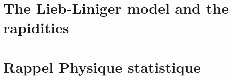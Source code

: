 

\newpage


                
%

\section{The Lieb-Liniger model and the rapidities}
\label{sec:LiebLiniger}



\section{Rappel Physique statistique} 

	



			            
